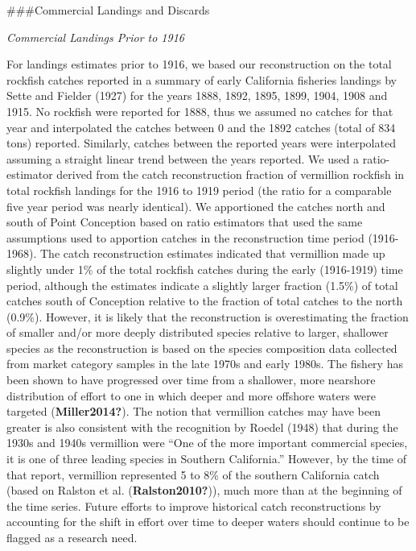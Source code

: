 \documentclass[11pt,
  english,
  a4paper,
]{article}
\begin{document}
\leavevmode\tagmcend\tagstructend

\#\#\#Commercial Landings and Discards

\emph{Commercial Landings Prior to 1916}

For landings estimates prior to 1916, we based our reconstruction on the total rockfish catches reported in a summary of early California fisheries landings by Sette and Fielder {(1927)\leavevmode\tagmcend\tagstructend} for the years 1888, 1892, 1895, 1899, 1904, 1908 and 1915. No rockfish were reported for 1888, thus we assumed no catches for that year and interpolated the catches between 0 and the 1892 catches (total of 834 tons) reported. Similarly, catches between the reported years were interpolated assuming a straight linear trend between the years reported. We used a ratio-estimator derived from the catch reconstruction fraction of vermillion rockfish in total rockfish landings for the 1916 to 1919 period (the ratio for a comparable five year period was nearly identical). We apportioned the catches north and south of Point Conception based on ratio estimators that used the same assumptions used to apportion catches in the reconstruction time period (1916-1968). The catch reconstruction estimates indicated that vermillion made up slightly under 1\% of the total rockfish catches during the early (1916-1919) time period, although the estimates indicate a slightly larger fraction (1.5\%) of total catches south of Conception relative to the fraction of total catches to the north (0.9\%). However, it is likely that the reconstruction is overestimating the fraction of smaller and/or more deeply distributed species relative to larger, shallower species as the reconstruction is based on the species composition data collected from market category samples in the late 1970s and early 1980s. The fishery has been shown to have progressed over time from a shallower, more nearshore distribution of effort to one in which deeper and more offshore waters were targeted {(\textbf{Miller2014?})\leavevmode\tagmcend\tagstructend}. The notion that vermillion catches may have been greater is also consistent with the recognition by Roedel {(1948)\leavevmode\tagmcend\tagstructend} that during the 1930s and 1940s vermillion were ``One of the more important commercial species, it is one of three leading species in Southern California.'' However, by the time of that report, vermillion represented 5 to 8\% of the southern California catch (based on Ralston et al. {(\textbf{Ralston2010?})\leavevmode\tagmcend\tagstructend}), much more than at the beginning of the time series. Future efforts to improve historical catch reconstructions by accounting for the shift in effort over time to deeper waters should continue to be flagged as a research need.
\end{document}
